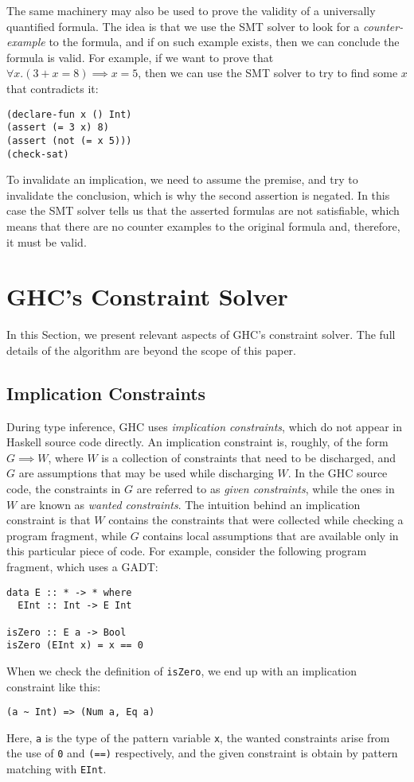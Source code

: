 \documentclass{sigplanconf}
\begin{document}
The same machinery may also be used to prove the validity of
a universally quantified formula. The idea is that we use the SMT solver
to look for a {\em counter-example} to the formula, and if on such
example exists, then we can conclude the formula is valid.
For example, if we want to prove that $\forall x. (3 + x = 8) \implies x = 5$,
then we can use the SMT solver to try to find some $x$ that contradicts it:

\begin{Verbatim}
(declare-fun x () Int)
(assert (= 3 x) 8)
(assert (not (= x 5)))
(check-sat)
\end{Verbatim}

To invalidate an implication, we need to assume the premise, and try to
invalidate the conclusion, which is why the second assertion is negated.
In this case the SMT solver tells us that the asserted formulas are not
satisfiable, which means that there are no counter examples to the original
formula and, therefore, it must be valid.


\section{GHC's Constraint Solver}
\label{GHC}

In this Section, we present relevant aspects of GHC's constraint solver.
The full details of the algorithm \cite{outsidein} are beyond the scope
of this paper.

\subsection{Implication Constraints}
During type inference, GHC uses {\em implication constraints}, which do
not appear in Haskell source code directly. An implication constraint is,
roughly, of the form $G\implies W$, where $W$ is a collection
of constraints that need to be discharged, and $G$ are assumptions that
may be used while discharging $W$.  In the GHC source code, the constraints
in $G$ are referred to as {\em given constraints}, while the ones in $W$ are
known as {\em wanted constraints}.  The intuition behind an implication
constraint is that $W$ contains the constraints that were collected
while checking a program fragment, while $G$ contains local assumptions
that are available only in this particular piece of code.  For example,
consider the following program fragment, which uses a GADT:
\begin{Verbatim}
data E :: * -> * where
  EInt :: Int -> E Int

isZero :: E a -> Bool
isZero (EInt x) = x == 0
\end{Verbatim}
When we check the definition of \Verb"isZero", we end up with an implication
constraint like this:
\begin{Verbatim}
(a ~ Int) => (Num a, Eq a)
\end{Verbatim}
Here, \Verb"a" is the type of the pattern variable \Verb"x", the wanted
constraints arise from the use of \Verb"0" and \Verb"(==)" respectively,
and the given constraint is obtain by pattern matching with \Verb"EInt".
\end{document}
